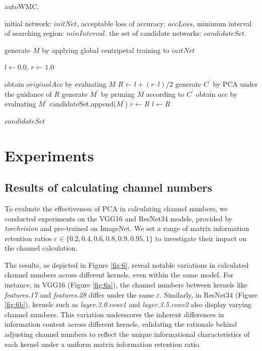 \documentclass[sigconf, 10pt]{acmart}
\begin{document}
\begin{algorithm}[!h]
    \caption{autoWMC.}
    \label{alg:AOA}
    \renewcommand{\algorithmicrequire}{\textbf{Input:}}
    \renewcommand{\algorithmicensure}{\textbf{Output:}}
    \begin{algorithmic}[1]
        \REQUIRE initial network: $initNet$, acceptable loss of accuracy: $accLoss$, minimum interval of searching region: $minInterval$.
        \ENSURE the set of candidate networks: $candidateSet$.

        \STATE  generate $M$ by applying global centripetal training to $initNet$

        \STATE  $l \leftarrow 0.0$, $r \leftarrow 1.0$

        \STATE  obtain $originalAcc$ by evaluating $M$
            \STATE $R \leftarrow l + (r – l) / 2$
            \STATE generate $C^\prime$ by PCA under the guidance of $R$
            \STATE generate $M^\prime$ by pruning $M$ according to $C^\prime$
            \STATE obtain $acc$ by evaluating $M^\prime$
                \STATE candidateSet.append($M^\prime$)
                \STATE $r \leftarrow R$
            \ELSE
                \STATE $l \leftarrow R$
            \ENDIF
        \ENDWHILE
        
        \RETURN $candidateSet$
    \end{algorithmic}
\end{algorithm}

\section{Experiments}

\subsection{Results of calculating channel numbers}

To evaluate the effectiveness of PCA in calculating channel numbers, we conducted experiments on the VGG16 and ResNet34 models, provided by \textit{torchvision} and pre-trained on ImageNet. We set a range of matrix information retention ratios \(
\varepsilon \in \{ 0.2, 0.4, 0.6, 0.8, 0.9, 0.95, 1 \}
\) to investigate their impact on the channel calculation.

The results, as depicted in Figure \ref{fig:6}, reveal notable variations in calculated channel numbers across different kernels, even within the same model. For instance, in VGG16 (Figure \ref{fig:6a}), the channel numbers between kernels like \textit{features.17} and \textit{features.28} differ under the same \(\varepsilon\). Similarly, in ResNet34 (Figure \ref{fig:6b}), kernels such as \textit{layer.3.0.conv1} and \textit{layer.3.5.conv2} also display varying channel numbers. This variation underscores the inherent differences in information content across different kernels, validating the rationale behind adjusting channel numbers to reflect the unique informational characteristics of each kernel under a uniform matrix information retention ratio.
\end{document}
